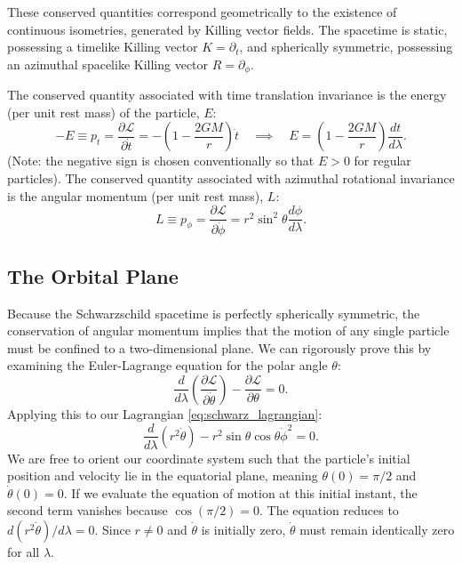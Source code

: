 \documentclass[11pt, a4paper]{report}
\begin{document}
These conserved quantities correspond geometrically to the existence of continuous isometries, generated by Killing vector fields. The spacetime is static, possessing a timelike Killing vector $K = \partial_{t}$, and spherically symmetric, possessing an azimuthal spacelike Killing vector $R = \partial_{\phi}$. 

The conserved quantity associated with time translation invariance is the energy (per unit rest mass) of the particle, $E$:
\begin{equation}
\label{eq:energy_conserved}
-E \equiv p_{t} = \frac{\partial \mathcal{L}}{\partial \dot{t}} = -\left(1-\frac{2GM}{r}\right)\dot{t} \quad \implies \quad E = \left(1-\frac{2GM}{r}\right)\frac{dt}{d\lambda}.
\end{equation}
(Note: the negative sign is chosen conventionally so that $E > 0$ for regular particles).
The conserved quantity associated with azimuthal rotational invariance is the angular momentum (per unit rest mass), $L$:
\begin{equation}
\label{eq:angular_conserved}
L \equiv p_{\phi} = \frac{\partial \mathcal{L}}{\partial \dot{\phi}} = r^{2}\sin^{2}\theta \frac{d\phi}{d\lambda}.
\end{equation}

\subsection{The Orbital Plane}

Because the Schwarzschild spacetime is perfectly spherically symmetric, the conservation of angular momentum implies that the motion of any single particle must be confined to a two-dimensional plane. We can rigorously prove this by examining the Euler-Lagrange equation for the polar angle $\theta$:
\begin{equation}
\frac{d}{d\lambda}\left( \frac{\partial \mathcal{L}}{\partial \dot{\theta}} \right) - \frac{\partial \mathcal{L}}{\partial \theta} = 0.
\end{equation}
Applying this to our Lagrangian \eqref{eq:schwarz_lagrangian}:
\begin{equation}
\frac{d}{d\lambda}(r^{2}\dot{\theta}) - r^{2}\sin\theta\cos\theta \dot{\phi}^{2} = 0.
\end{equation}
We are free to orient our coordinate system such that the particle's initial position and velocity lie in the equatorial plane, meaning $\theta(0) = \pi/2$ and $\dot{\theta}(0) = 0$. If we evaluate the equation of motion at this initial instant, the second term vanishes because $\cos(\pi/2) = 0$. The equation reduces to $d(r^{2}\dot{\theta})/d\lambda = 0$. Since $r \neq 0$ and $\dot{\theta}$ is initially zero, $\dot{\theta}$ must remain identically zero for all $\lambda$. 
\end{document}
